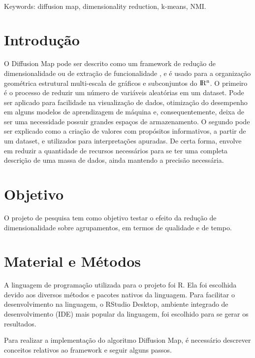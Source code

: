 \documentclass{article}
\begin{document}
        \\ Keywords: diffusion map, dimensionality reduction, k-means, NMI.

    \newpage

    \tableofcontents

    \newpage

    \section{Introdução}

        O Diffusion Map pode ser descrito como um framework de redução de dimensionalidade ou de extração de funcionalidade \cite{coifman2006diffusion}, e é usado para a organização geométrica estrutural multi-escala de gráficos e subconjuntos do $\rm I\!R^{n}$\cite{coifman2005geometric}.
        O primeiro é o processo de reduzir um número de variáveis aleatórias em um dataset.
        Pode ser aplicado para facilidade na visualização de dados, otimização do desempenho em alguns modelos de aprendizagem de máquina e, consequentemente, deixa de ser uma necessidade possuir grandes espaços de armazenamento.
        O segundo pode ser explicado como a criação de valores com propósitos informativos, a partir de um dataset, e utilizados para interpretações apuradas.
        De certa forma, envolve em reduzir a quantidade de recursos necessários para se ter uma completa descrição de uma massa de dados, ainda mantendo a precisão necessária.

    \section{Objetivo}

        O projeto de pesquisa tem como objetivo testar o efeito da redução de dimensionalidade sobre agrupamentos, em termos de qualidade e de tempo.

    \section{Material e Métodos}

        A linguagem de programação utilizada para o projeto foi R\cite{R}.
        Ela foi escolhida devido aos diversos métodos e pacotes nativos da linguagem.
        Para facilitar o desenvolvimento na linguagem, o RStudio Desktop, ambiente integrado de desenvolvimento (IDE) mais popular da linguagem, foi escolhido para se gerar os resultados.

        Para realizar a implementação do algoritmo Diffusion Map, é necessário descrever conceitos relativos ao framework e seguir alguns passos.
\end{document}

